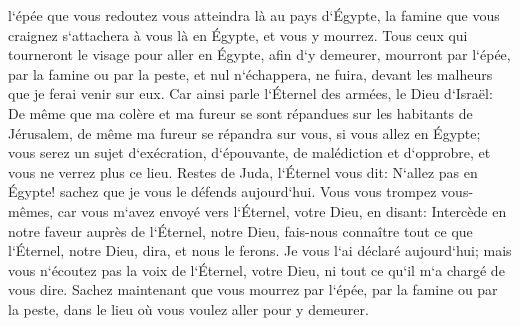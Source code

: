 \verse l`épée que vous redoutez vous atteindra là au pays d`Égypte, la famine que vous craignez s`attachera à vous là en Égypte, et vous y mourrez. 
\verse Tous ceux qui tourneront le visage pour aller en Égypte, afin d`y demeurer, mourront par l`épée, par la famine ou par la peste, et nul n`échappera, ne fuira, devant les malheurs que je ferai venir sur eux. 
\verse Car ainsi parle l`Éternel des armées, le Dieu d`Israël: De même que ma colère et ma fureur se sont répandues sur les habitants de Jérusalem, de même ma fureur se répandra sur vous, si vous allez en Égypte; vous serez un sujet d`exécration, d`épouvante, de malédiction et d`opprobre, et vous ne verrez plus ce lieu. 
\verse Restes de Juda, l`Éternel vous dit: N`allez pas en Égypte! sachez que je vous le défends aujourd`hui. 
\verse Vous vous trompez vous-mêmes, car vous m`avez envoyé vers l`Éternel, votre Dieu, en disant: Intercède en notre faveur auprès de l`Éternel, notre Dieu, fais-nous connaître tout ce que l`Éternel, notre Dieu, dira, et nous le ferons. 
\verse Je vous l`ai déclaré aujourd`hui; mais vous n`écoutez pas la voix de l`Éternel, votre Dieu, ni tout ce qu`il m`a chargé de vous dire. 
\verse Sachez maintenant que vous mourrez par l`épée, par la famine ou par la peste, dans le lieu où vous voulez aller pour y demeurer. 

\chapter{}

